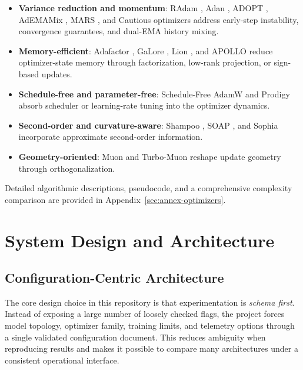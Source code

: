 \documentclass[11pt,a4paper]{article}
\begin{document}
\begin{itemize}[leftmargin=*]
    \item \textbf{Variance reduction and momentum}: RAdam \citep{liu_variance_2019}, Adan \citep{xie_adan_2022}, ADOPT \citep{taniguchi_adopt_2024}, AdEMAMix \citep{pagliardini_ademamix_2024}, MARS \citep{yuan_mars_2024}, and Cautious optimizers \citep{liang_cautious_2024} address early-step instability, convergence guarantees, and dual-EMA history mixing.
    \item \textbf{Memory-efficient}: Adafactor \citep{shazeer_adafactor_2018}, GaLore \citep{zhao_galore_2024}, Lion \citep{chen_symbolic_2023}, and APOLLO \citep{zhu2025apollosgdlikememoryadamwlevel} reduce optimizer-state memory through factorization, low-rank projection, or sign-based updates.
    \item \textbf{Schedule-free and parameter-free}: Schedule-Free AdamW \citep{defazio_road_2024} and Prodigy \citep{mishchenko_prodigy_2023} absorb scheduler or learning-rate tuning into the optimizer dynamics.
    \item \textbf{Second-order and curvature-aware}: Shampoo \citep{gupta_shampoo_2018}, SOAP \citep{vyas_soap_2024}, and Sophia \citep{liu_sophia_2023} incorporate approximate second-order information.
    \item \textbf{Geometry-oriented}: Muon \citep{shen_convergence_2025} and Turbo-Muon \citep{boissin_turbo-muon_2025} reshape update geometry through orthogonalization.
\end{itemize}

Detailed algorithmic descriptions, pseudocode, and a comprehensive complexity comparison are provided in Appendix~\ref{sec:annex-optimizers}.

\section{System Design and Architecture}
\label{sec:system-design}

\subsection{Configuration-Centric Architecture}
\label{sec:config-centric-architecture}

The core design choice in this repository is that experimentation is \emph{schema first}. Instead of exposing a large number of loosely checked flags, the project forces model topology, optimizer family, training limits, and telemetry options through a single validated configuration document. This reduces ambiguity when reproducing results and makes it possible to compare many architectures under a consistent operational interface.
\end{document}
